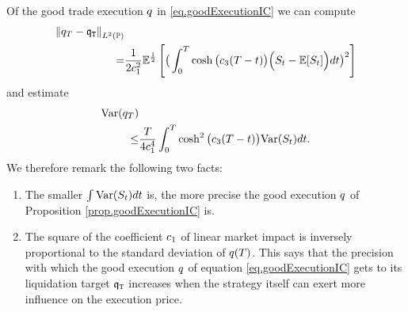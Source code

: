 \documentclass[10pt,a4paper]{article}
\begin{document}
	\begin{remark}\label{remark.varianceOfLiquidationError}
		Of the good trade execution  $\inventory$ in \eqref{eq.goodExecutionIC} we can compute 
		\begin{equation*}
		\begin{split}
		\norm[\inventory_\timeHorizon-\liquidationTarget]_{\Ltwo(\Prob)} &\\
		=& \frac{1}{2\coeffMarketImpact\squared} \Expectation^{\half}
		\left[\big(
		\int_{0}^{\timeHorizon} \cosh\big(\ratioAversionOverImpact (T-t)\big) \Big(
		\fundamentalPrice_t-\Expectation[\fundamentalPrice_t]
		\Big)dt
		\big)\squared\right]
		\end{split}
		\end{equation*}
		and estimate
		\begin{equation*}
		\begin{split}
		\Variance(\inventory_\timeHorizon) &\\
		\leq& \frac{T}{4\coeffMarketImpact^{4}} 
		\int_{0}^{T} \cosh\squared\big(\ratioAversionOverImpact (T-t)\big) \Variance(\fundamentalPrice_t)dt.
		\end{split}
		\end{equation*}
		We therefore remark the following two facts:
		\begin{enumerate}
			\item The smaller $\int \Variance(\fundamentalPrice_t)dt$ is, the more precise the good execution $\inventory$ of Proposition \ref{prop.goodExecutionIC} is.
			\item The square of the coefficient $\coeffMarketImpact$ of linear market impact is inversely proportional to the standard deviation of $\inventory(T)$. This says that the precision with which the good execution $\inventory$ of equation \eqref{eq.goodExecutionIC} gets to its liquidation target $\liquidationTarget$ increases when the strategy itself can exert more influence on the execution price. 
		\end{enumerate}
	\end{remark}
	
\end{document}
